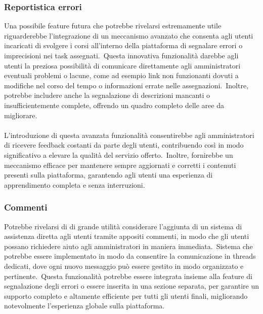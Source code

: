 \subsubsection{Reportistica errori}
Una possibile feature futura che potrebbe rivelarsi estremamente utile riguarderebbe 
l'integrazione di un meccanismo avanzato che consenta agli utenti incaricati di svolgere 
i corsi all'interno della piattaforma di segnalare errori o imprecisioni nei task assegnati.\ 
Questa innovativa funzionalità darebbe agli utenti la preziosa possibilità di comunicare direttamente 
agli amministratori eventuali problemi o lacune, come ad esempio link non funzionanti dovuti a modifiche 
nel corso del tempo o informazioni errate nelle assegnazioni.\ Inoltre, potrebbe includere anche la segnalazione 
di descrizioni mancanti o insufficientemente complete, offrendo un quadro completo delle aree da migliorare.
\\ \\
L'introduzione di questa avanzata funzionalità consentirebbe agli amministratori di ricevere feedback costanti 
da parte degli utenti, contribuendo così in modo significativo a elevare la qualità del servizio offerto.\ 
Inoltre, fornirebbe un meccanismo efficace per mantenere sempre aggiornati e corretti i contenuti presenti 
sulla piattaforma, garantendo agli utenti una esperienza di apprendimento completa e senza interruzioni.
\subsubsection{Commenti}
Potrebbe rivelarsi di di grande utilità considerare l'aggiunta di un sistema di assistenza diretta agli utenti 
tramite appositi commenti, in modo che gli utenti possano richiedere aiuto agli amministratori in maniera immediata.\ 
Sistema che potrebbe essere implementato in modo da consentire la comunicazione in threads dedicati, dove 
ogni nuovo messaggio può essere gestito in modo organizzato e pertinente.\ 
Questa funzionalità potrebbe essere integrata insieme alla feature di segnalazione degli errori o essere 
inserita in una sezione separata, per garantire un supporto completo e altamente efficiente per tutti gli utenti finali, 
migliorando notevolmente l'esperienza globale sulla piattaforma.
%
